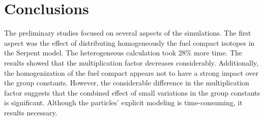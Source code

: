 \documentclass[11pt,letterpaper]{article}
\begin{document}





\section{Conclusions}

The preliminary studies focused on several aspects of the simulations.
The first aspect was the effect of distributing homogeneously the fuel compact isotopes in the Serpent model.
The heterogeneous calculation took 28$\%$ more time.
The results showed that the multiplication factor decreases considerably.
Additionally, the homogenization of the fuel compact appears not to have a strong impact over the group constants.
However, the considerable difference in the multiplication factor suggests that the combined effect of small variations in the group constants is significant.
Although the particles’ explicit modeling is time-consuming, it results necessary.

\end{document}
